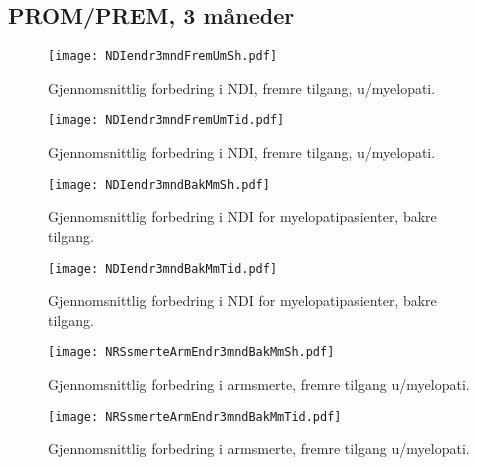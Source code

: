 \documentclass[presentation,xcolor=pdftex,dvipsnames,table]{beamer}\usepackage[]{graphicx}\usepackage[]{color}
\begin{document}
\begin{tiny}
\section{PROM/PREM, 3 måneder}

\begin{frame}[fragile]
\begin{figure}[ht]
\centering
\texttt{[image: NDIendr3mndFremUmSh.pdf]}
\caption{Gjennomsnittlig forbedring i NDI, fremre tilgang, u/myelopati. }
\end{figure}
\end{frame}

\begin{frame}[fragile]
\begin{figure}[ht]
\centering
\texttt{[image: NDIendr3mndFremUmTid.pdf]}
\caption{Gjennomsnittlig forbedring i NDI, fremre tilgang, u/myelopati. }
\end{figure}
\end{frame}

\begin{frame}[fragile]
\begin{figure}[ht]
\centering
\texttt{[image: NDIendr3mndBakMmSh.pdf]}
\caption{Gjennomsnittlig forbedring i NDI for myelopatipasienter, bakre tilgang.}
\end{figure}
\end{frame}

\begin{frame}[fragile]
\begin{figure}[ht]
\centering
\texttt{[image: NDIendr3mndBakMmTid.pdf]}
\caption{Gjennomsnittlig forbedring i NDI for myelopatipasienter, bakre tilgang.}
\end{figure}
\end{frame}

\begin{frame}[fragile]
\begin{figure}[ht]
\centering
\texttt{[image: NRSsmerteArmEndr3mndBakMmSh.pdf]}
\caption{Gjennomsnittlig forbedring i armsmerte, fremre tilgang u/myelopati.}
\end{figure}
\end{frame}

\begin{frame}[fragile]
\begin{figure}[ht]
\centering
\texttt{[image: NRSsmerteArmEndr3mndBakMmTid.pdf]}
\caption{Gjennomsnittlig forbedring i armsmerte, fremre tilgang u/myelopati.}
\end{figure}
\end{frame}


\end{tiny}
\end{document}
